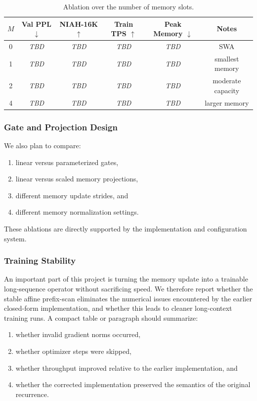 \documentclass{article}
\newcommand{\baseline}{SWA}
\newcommand{\todoresult}{\textit{TBD}}
\begin{document}
\begin{table}[t]
    \centering
    \caption{Ablation over the number of memory slots.}
    \label{tab:slots}
    \begin{tabular}{cccccc}
        \toprule
        $M$ & Val PPL $\downarrow$ & NIAH-16K $\uparrow$ & Train TPS $\uparrow$ & Peak Memory $\downarrow$ & Notes \\
        \midrule
        0 & \todoresult & \todoresult & \todoresult & \todoresult & \baseline \\
        1 & \todoresult & \todoresult & \todoresult & \todoresult & smallest memory \\
        2 & \todoresult & \todoresult & \todoresult & \todoresult & moderate capacity \\
        4 & \todoresult & \todoresult & \todoresult & \todoresult & larger memory \\
        \bottomrule
    \end{tabular}
\end{table}

\subsubsection{Gate and Projection Design}

We also plan to compare:
\begin{enumerate}
    \item linear versus parameterized gates,
    \item linear versus scaled memory projections,
    \item different memory update strides, and
    \item different memory normalization settings.
\end{enumerate}
These ablations are directly supported by the implementation and configuration system.

\subsubsection{Training Stability}

An important part of this project is turning the memory update into a trainable long-sequence operator without sacrificing speed. We therefore report whether the stable affine prefix-scan eliminates the numerical issues encountered by the earlier closed-form implementation, and whether this leads to cleaner long-context training runs. A compact table or paragraph should summarize:
\begin{enumerate}
    \item whether invalid gradient norms occurred,
    \item whether optimizer steps were skipped,
    \item whether throughput improved relative to the earlier implementation, and
    \item whether the corrected implementation preserved the semantics of the original recurrence.
\end{enumerate}
\end{document}
